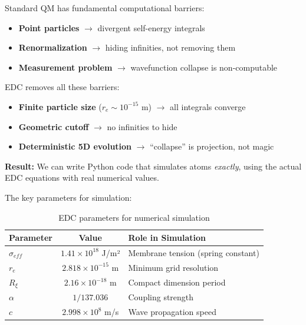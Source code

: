 \begin{tcolorbox}[colback=green!5,colframe=green!70!black,title=\textbf{Why EDC Enables Exact Simulation}]
Standard QM has fundamental computational barriers:

\begin{itemize}
    \item \textbf{Point particles} $\to$ divergent self-energy integrals
    \item \textbf{Renormalization} $\to$ hiding infinities, not removing them
    \item \textbf{Measurement problem} $\to$ wavefunction collapse is non-computable
\end{itemize}

EDC removes all these barriers:

\begin{itemize}
    \item \textbf{Finite particle size} ($r_e \sim 10^{-15}$ m) $\to$ all integrals converge
    \item \textbf{Geometric cutoff} $\to$ no infinities to hide
    \item \textbf{Deterministic 5D evolution} $\to$ ``collapse'' is projection, not magic
\end{itemize}

\textbf{Result:} We can write Python code that simulates atoms \textit{exactly}, using the actual EDC equations with real numerical values.
\end{tcolorbox}

The key parameters for simulation:

\begin{table}[h]
\centering
\begin{tabular}{|l|c|l|}
\hline
\textbf{Parameter} & \textbf{Value} & \textbf{Role in Simulation} \\
\hline
$\sigma_{eff}$ & $1.41 \times 10^{18}$ J/m² & Membrane tension (spring constant) \\
$r_e$ & $2.818 \times 10^{-15}$ m & Minimum grid resolution \\
$R_\xi$ & $2.16 \times 10^{-18}$ m & Compact dimension period \\
$\alpha$ & $1/137.036$ & Coupling strength \\
$c$ & $2.998 \times 10^8$ m/s & Wave propagation speed \\
\hline
\end{tabular}
\caption{EDC parameters for numerical simulation}
\label{tab:simulation_params}
\end{table}

